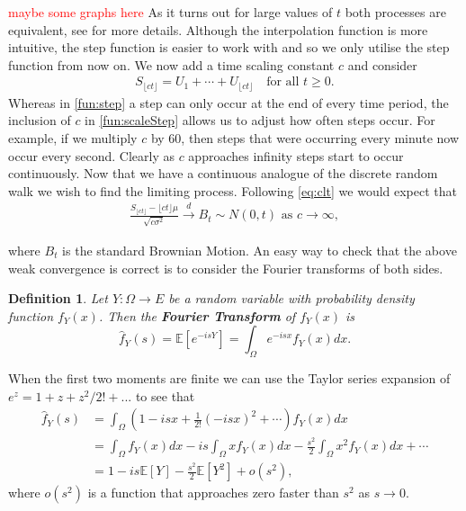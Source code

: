 \documentclass[honours,12pt]{UNSWthesis}
\newcommand{\E}{\mathbb{E}}
\newcommand{\1}{\mathbf 1}
\newtheorem{definition}[theorem]{Definition}
\numberwithin{equation}{section}
\theoremstyle{definition}
\theoremstyle{remark}
\begin{document}
\textcolor{red}{maybe some graphs here}
As it turns out for large values of $t$ both processes are equivalent, see \cite{Whitt2010} for more details. Although the interpolation function is more intuitive, the step function is easier to work with and so we only utilise the step function from now on. We now add a time scaling constant $c$ and consider 
\begin{align}\label{fun:scaleStep}
	S_{\lfloor ct \rfloor}=U_1+\cdots+U_{\lfloor ct \rfloor}  \quad\textrm{for all } t\geq0.
\end{align}
Whereas in \ref{fun:step} a step can only occur at the end of every time period, the inclusion of $c$ in \ref{fun:scaleStep} allows us to adjust how often steps occur. For example, if we multiply $c$ by 60, then steps that were occurring every minute now occur every second. Clearly as $c$ approaches infinity steps start to occur continuously. Now that we have a continuous analogue of the discrete random walk we wish to find the limiting process. Following \ref{eq:clt} we would expect that
\begin{align}\label{eq:BMconv}
	\frac{S_{\lfloor ct\rfloor}-\lfloor ct \rfloor \mu}{\sqrt{c\sigma^2}}\overset{d}{\longrightarrow}B_t\sim N(0,t)\textrm{ as $c\to\infty$},
\end{align}

\noindent where $B_t$ is the standard Brownian Motion. An easy way to check that the above weak convergence is correct is to consider the Fourier transforms of both sides.\\
\begin{definition}
	Let $Y:\Omega\to E$ be a random variable with probability density function $f_Y(x)$. Then the \textbf{Fourier Transform}  of $f_Y(x)$ is
	\[
		\hat{f}_Y(s)=\E[e^{-isY}]=\int_\Omega e^{-isx} f_Y(x)dx.
	\]
\end{definition}

\noindent When the first two moments are finite we can use the Taylor series expansion of $e^z=1+z+z^2/2!+...$ to see that
\begin{align}
	\hat{f}_Y(s)&=\int_\Omega\left(1-isx+\frac{1}{2!}(-isx)^2+\cdots \right)f_Y(x)dx\\
	&=\int_\Omega f_Y(x)dx - is \int_\Omega x f_Y(x)dx - \frac{s^2}{2}\int_\Omega x^2 f_Y(x)dx +\cdots\\
	&=1-is\E[Y]-\frac{s^2}{2}\E[Y^2] +o(s^2),
\end{align}
\noindent where $o(s^2)$ is a function that approaches zero faster than $s^2$ as $s\to0.$ 
\end{document}
